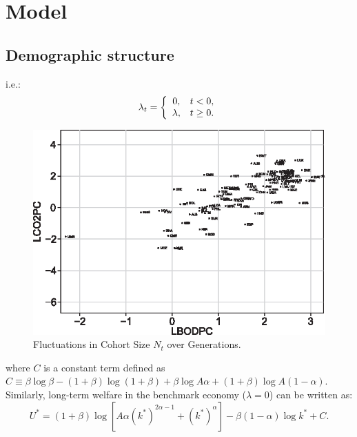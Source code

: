 \documentclass[nogrid]{MBE}%
\begin{document}
\section{Model\label{sec:Model}}

\subsection{Demographic structure}



i.e.:
\begin{equation}
\lambda_{t}=\left\{
\begin{array}
[c]{cc}%
0, & t<0,\\
\lambda, & t\geq0.
\end{array}
\right.  \label{eq:lambda}%
\end{equation}


\begin{figure}[t]
\begin{center}
\includegraphics[height=0.21\textheight]{flrf1.eps}
\end{center}
\caption{Fluctuations in Cohort Size $N_{t}$ over Generations.}%
\label{fig:popdynamics}%
\end{figure}


where $C$ is a constant term defined as $C\equiv\beta\log\beta-(1+\beta
)\log(1+\beta)+\beta\log A\alpha+(1+\beta)\log A\left(  1-\alpha\right)  $.
Similarly, long-term welfare in the benchmark economy ($\lambda=0$) can be
written as:
\begin{equation}
U^{\ast}=\left(  1+\beta\right)  \log[A\alpha\left(  k^{\ast}\right)
^{2\alpha-1}+\left(  k^{\ast}\right)  ^{\alpha}]-\beta\left(  1-\alpha\right)
\log k^{\ast}+C. \label{eq:U_benchmark}%
\end{equation}
\end{document}
